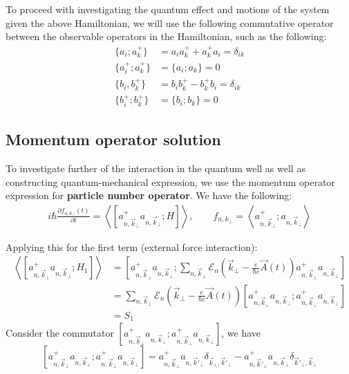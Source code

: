 \documentclass{article}
\begin{document}
To proceed with investigating the quantum effect and motions of the system given the above Hamiltonian, we will use the following commutative operator between the observable operators in the Hamiltonian, such as the following: 
\begin{align}
    \{ a_{i} ; a_{k}^{+} \} &= a_{i}a_{k}^{+} + a^{+}_{k}a_{i} = \delta_{ik} \\
    \{ a_{i}^{+} ; a_{k}^{+} \} & = \{ a_{i}; a_{k} \} = 0 \\
    \{ b_{i} , b_{k}^{+} \} & = b_{i}b^{+}_{k} - b_{k}^{+}b_{i} = \delta_{ik} \\
    \{ b_{i}^{+}; b_{k}^{+} \} &= \{b_{i} ; b_{k}\} = 0
\end{align}
\subsection{Momentum operator solution}

To investigate further of the interaction in the quantum well as well as constructing quantum-mechanical expression, we use the momentum operator expression for \textbf{particle number operator}. We have the following: 
\begin{align}
    i \hbar \frac{\partial f_{n, k_{\perp}}(t)}{\partial t} = \left\langle \left[ a^{+}_{n,\vec{k}_{\perp}}  a_{n,\vec{k}_{\perp}}; H \right] \right\rangle, \quad \quad f_{n, k_{\perp}} = \left\langle a^{+}_{n,\vec{k}_{\perp}} ; a_{n,\vec{k}_{\perp}} \right\rangle
\end{align}

Applying this for the first term (external force interaction): 
\begin{align}
    \left\langle \left[ a^{+}_{n,\vec{k}_{\perp}}  a_{n,\vec{k}_{\perp}}; H_{1} \right] \right\rangle & = \left[ a^{+}_{n,\vec{k}_{\perp}}  a_{n,\vec{k}_{\perp}}; \sum_{n,\vec{k}_{\perp}} \mathcal{E}_{n}\left(\vec{k}_{\perp} - \frac{e}{\hbar c} \vec{A}(t)\right)a^{+}_{n,\vec{k}_{\perp}} a_{n,\vec{k}_{\perp}} \right] \\
    & = \sum_{n,\vec{k}_{\perp}} \mathcal{E}_{n}\left(\vec{k}_{\perp} - \frac{e}{\hbar c} \vec{A}(t)\right)\left[ a^{+}_{n,\vec{k}_{\perp}}  a_{n,\vec{k}_{\perp}}; a^{+}_{n,\vec{k}_{\perp}} a_{n,\vec{k}_{\perp}} \right]\\
    & = S_{1}
\end{align}
Consider the commutator $\left[ a^{+}_{n,\vec{k}_{\perp}}  a_{n,\vec{k}_{\perp}}; a^{+}_{n,\vec{k}_{\perp}} a_{n,\vec{k}_{\perp}} \right]$, we have 
\begin{equation}
    \left[ a^{+}_{n,\vec{k}_{\perp}}  a_{n,\vec{k}_{\perp}}; a^{+}_{n,\vec{k}_{\perp}} a_{n,\vec{k}_{\perp}} \right] = a^{+}_{n,\vec{k}_{\perp}} a_{n,\vec{k}'_{\perp}} \delta_{\vec{k}_{\perp},\vec{k}'_{\perp}} - a^{+}_{n,\vec{k}'_{\perp}} a_{n,\vec{k}_{\perp}} \delta_{\vec{k}'_{\perp},\vec{k}_{\perp}}
\end{equation}
\end{document}

